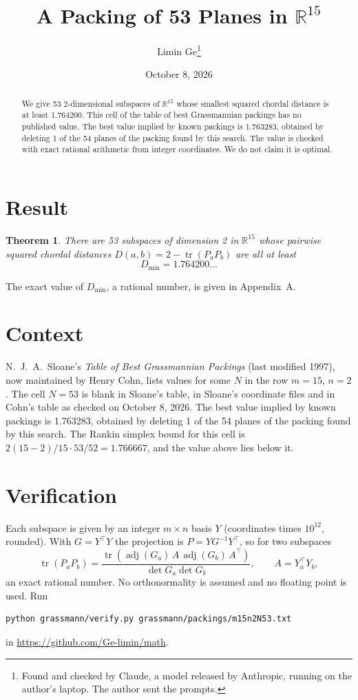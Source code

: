 \documentclass[11pt,a4paper]{article}
\title{A Packing of 53 Planes in $\mathbb{R}^{15}$}
\author{Limin Ge\thanks{Found and checked by Claude, a model released by Anthropic, running on the author's laptop. The author sent the prompts.}}
\date{October 8, 2026}
\newtheorem*{theorem}{Theorem}
\begin{document}
\maketitle
\begin{abstract}
We give 53 2-dimensional subspaces of $\mathbb{R}^{15}$ whose smallest squared chordal distance is at least 1.764200. This cell of the table of best Grassmannian packings has no published value. The best value implied by known packings is 1.763283, obtained by deleting 1 of the 54 planes of the packing found by this search. The value is checked with exact rational arithmetic from integer coordinates. We do not claim it is optimal.
\end{abstract}

\section{Result}
\begin{theorem}
There are 53 subspaces of dimension 2 in $\mathbb{R}^{15}$ whose pairwise squared chordal distances $D(a,b) = 2 - \operatorname{tr}(P_aP_b)$ are all at least
\[ D_{\min} = 1.764200\ldots \]
\end{theorem}
The exact value of $D_{\min}$, a rational number, is given in Appendix~A.


\section{Context}
N.~J.~A.~Sloane's \emph{Table of Best Grassmannian Packings} (last modified 1997), now maintained by Henry Cohn, lists values for some $N$ in the row $m=15$, $n=2$. The cell $N=53$ is blank in Sloane's table, in Sloane's coordinate files and in Cohn's table as checked on October 8, 2026. The best value implied by known packings is 1.763283, obtained by deleting 1 of the 54 planes of the packing found by this search. The Rankin simplex bound for this cell is $2(15-2)/15\cdot 53/52 = 1.766667$, and the value above lies below it.


\section{Verification}
Each subspace is given by an integer $m\times n$ basis $Y$ (coordinates times $10^{12}$, rounded). With $G=Y^\top Y$ the projection is $P=YG^{-1}Y^\top$, so for two subspaces
\[ \operatorname{tr}(P_aP_b)=\frac{\operatorname{tr}(\operatorname{adj}(G_a)\,A\,\operatorname{adj}(G_b)\,A^\top)}{\det G_a\det G_b},\qquad A=Y_a^\top Y_b, \]
an exact rational number. No orthonormality is assumed and no floating point is used. Run
\begin{verbatim}
python grassmann/verify.py grassmann/packings/m15n2N53.txt
\end{verbatim}
in \url{https://github.com/Ge-limin/math}.
\end{document}
